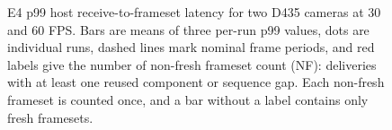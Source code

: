 \begin{figure}[t]
\centering
\resizebox{\textwidth}{!}{%
}
\caption{E4 p99 host receive-to-frameset latency for two D435 cameras at 30
and 60 FPS.  Bars are means of three per-run p99 values, dots are individual
runs, dashed lines mark nominal frame periods, and red labels give the number
of non-fresh frameset count (NF): deliveries with at least one reused component
or sequence gap.  Each non-fresh frameset is counted once, and a bar without a
label contains only fresh framesets.}
\label{fig:main-matrix}
\end{figure}
